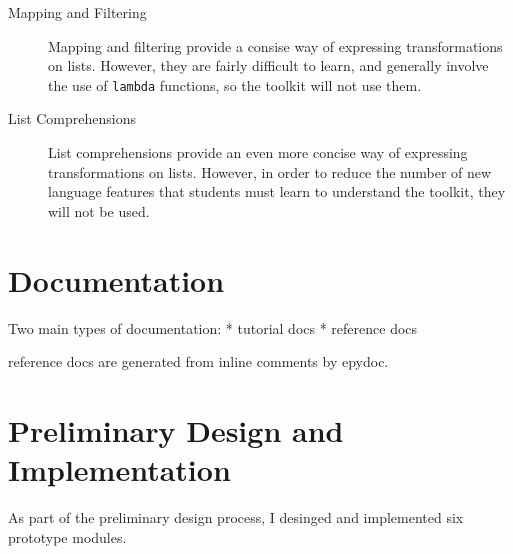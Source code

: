 \documentclass{article}
\begin{document}
\begin{description}
  \item[Mapping and Filtering] Mapping and filtering provide a
  consise way of expressing transformations on lists.  However, they
  are fairly difficult to learn, and generally involve the use of
  \texttt{lambda} functions, so the toolkit will not use them.

  \item[List Comprehensions] List comprehensions provide an even more
  concise way of expressing transformations on lists.  However, in
  order to reduce the number of new language features that students
  must learn to understand the toolkit, they will not be used.

\end{description}

\section{Documentation}

Two main types of documentation:
  * tutorial docs
  * reference docs

reference docs are generated from inline comments by epydoc.  

\section{Preliminary Design and Implementation}

As part of the preliminary design process, I desinged and implemented
six prototype modules.  

\begin{thebibliography}{1}




\end{thebibliography}
\end{document}
